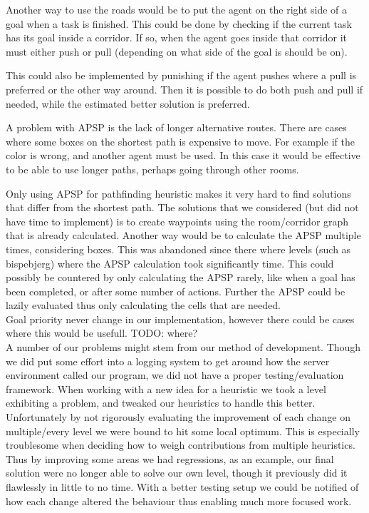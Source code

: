 \documentclass[letterpaper]{article}
\begin{document}
Another way to use the roads would be to put the agent on the right side of
a goal when a task is finished. This could be done by checking if the current task
has its goal inside a corridor. If so, when the agent goes inside that corridor
it must either push or pull (depending on what side of the goal is should be on).

This could also be implemented by punishing if the agent pushes where a pull is
preferred or the other way around. Then it is possible to do both push and pull
if needed, while the estimated better solution is preferred.

A problem with APSP is the lack of longer alternative routes. There are cases
where some boxes on the shortest path is expensive to move. For example if
the color is wrong, and another agent must be used. In this case it would be
effective to be able to use longer paths, perhaps going through other rooms.

Only using APSP for pathfinding heuristic makes it very hard to find solutions
that differ from the shortest path. The solutions that we considered (but did not
have time to implement) is to create waypoints using the room/corridor graph
that is already calculated. Another way would be to calculate the APSP multiple
times, considering boxes. This was abandoned since there where levels (such as bispebjerg)
where the APSP calculation took significantly time. This could possibly be countered
by only calculating the APSP rarely, like when a goal has been completed, or
after some number of actions. Further the APSP could be lazily evaluated thus
only calculating the cells that are needed.\\

Goal priority never change in our implementation, however there could be cases
where this would be usefull. TODO: where?\\

A number of our problems might stem from our method of development.
Though we did put some effort into a logging system to get around how the server
environment called our program, we did not have a proper testing/evaluation
framework.
When working with a new idea for a heuristic we took a level exhibiting a
problem, and tweaked our heuristics to handle this better.
Unfortunately by not rigorously evaluating the improvement of each change on
multiple/every level we were bound to hit some local optimum. This is especially
troublesome when deciding how to weigh contributions from multiple heuristics.
Thus by improving some areas we had regressions, as an example, our final
solution were no longer able to solve our own level, though it previously did it
flawlessly in little to no time. With a better testing setup we could be notified of how
each change altered the behaviour thus enabling much more focused work.
\end{document}
